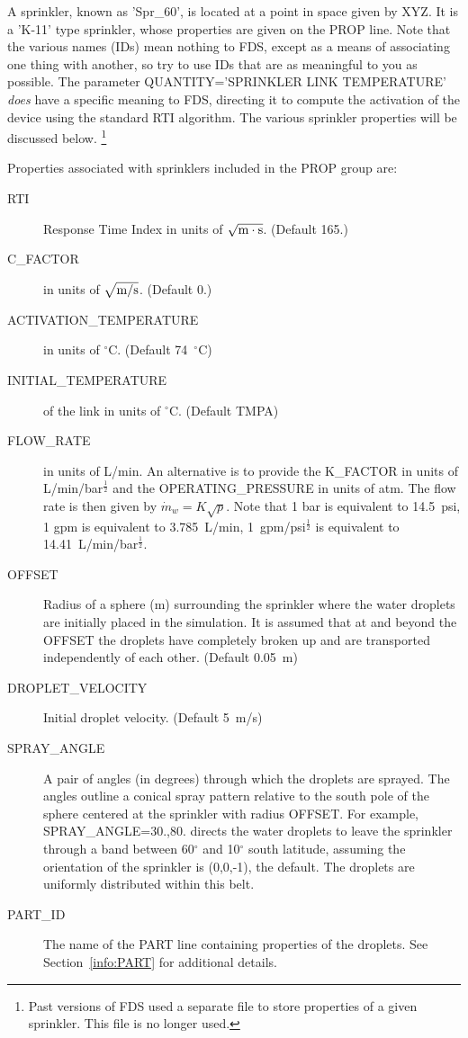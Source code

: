\documentclass[11pt]{book}
\newcommand{\dm}{\dot{m}}
\newcommand{\ha}{\frac{1}{2}}
\begin{document}
\noindent
A sprinkler, known as {\ct 'Spr\_60'}, is located at a point in space given by {\ct XYZ}. It is a {\ct 'K-11'} type sprinkler, whose properties are given on
the {\ct PROP} line. Note that the various names ({\ct ID}s) mean nothing to FDS, except as a means of associating one thing with another, so try to use {\ct ID}s that are as
meaningful to you as possible.  The parameter {\ct QUANTITY='SPRINKLER LINK TEMPERATURE'} {\em does} have a specific meaning to FDS, directing it to compute the activation of
the device using the standard RTI algorithm. The various sprinkler properties will be discussed below.
\footnote{Past versions of FDS used a separate file to store
properties of a given sprinkler. This file is no longer used.}

Properties associated with sprinklers included in the {\ct PROP} group are:
\begin{description}
\item[{\ct RTI}] Response Time Index in units of $\sqrt{\hbox{m}\cdot \hbox{s}}$. (Default 165.)
\item[{\ct C\_FACTOR}] in units of $\sqrt{\hbox{m/s}}$. (Default 0.)
\item[{\ct ACTIVATION\_TEMPERATURE}] in units of $^\circ$C. (Default 74~$^\circ$C)
\item[{\ct INITIAL\_TEMPERATURE}] of the link in units of $^\circ$C. (Default {\ct TMPA})
\item[{\ct FLOW\_RATE}] in units of L/min.
An alternative is to provide the {\ct K\_FACTOR} in units of L/min/bar$^\ha$ and the
{\ct OPERATING\_PRESSURE} in units of atm.
The flow rate is then given by $ \dm_w = K \sqrt{p}$. Note that 1 bar is equivalent to
14.5~psi, 1 gpm is equivalent to 3.785~L/min, 1~gpm/psi$^\ha$ is
equivalent to 14.41~L/min/bar$^\ha$.
\item[{\ct OFFSET}] Radius of a sphere (m) surrounding the
sprinkler where the water droplets are initially placed in the simulation. It is assumed that
at and beyond the {\ct OFFSET} the droplets have completely broken
up and are transported independently of each other. (Default 0.05~m)
\item[{\ct DROPLET\_VELOCITY}]  Initial droplet velocity. (Default 5~m/s)
\item[{\ct SPRAY\_ANGLE}] A pair of angles (in degrees) through which the droplets are sprayed.
The angles outline a conical spray pattern relative to the
south pole of the sphere centered at the sprinkler with radius {\ct OFFSET}.
For example, {\ct SPRAY\_ANGLE=30.,80.} directs the water droplets to leave
the sprinkler through a band between 60$^\circ$ and 10$^\circ$ south latitude, assuming the orientation of
the sprinkler is (0,0,-1), the default. The droplets are uniformly
distributed within this belt.
\item[{\ct PART\_ID}] The name of the {\ct PART} line containing properties of the droplets.
See Section~\ref{info:PART} for additional details.
\end{description}
\end{document}
